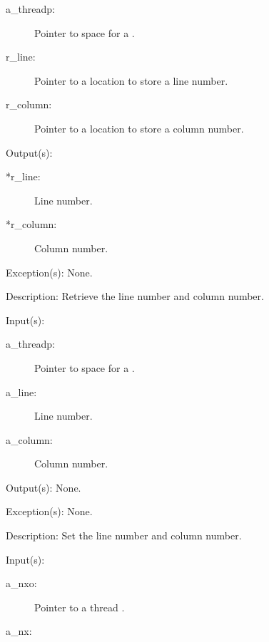 \begin{capi}
\begin{capilist}
\begin{description}
		\item[a\_threadp: ]
			Pointer to space for a .
		\item[r\_line: ]
			Pointer to a location to store a line number.
		\item[r\_column: ]
			Pointer to a location to store a column number.
		\end{description}
	\item[Output(s): ]
		\begin{description}\item[]
		\item[*r\_line: ]
			Line number.
		\item[*r\_column: ]
			Column number.
		\end{description}
	\item[Exception(s): ] None.
	\item[Description: ]
		Retrieve the line number and column number.
	\end{capilist}
\label{nxo_threadp_position_set}
	\begin{capilist}
	\item[Input(s): ]
		\begin{description}\item[]
		\item[a\_threadp: ]
			Pointer to space for a .
		\item[a\_line: ]
			Line number.
		\item[a\_column: ]
			Column number.
		\end{description}
	\item[Output(s): ] None.
	\item[Exception(s): ] None.
	\item[Description: ]
		Set the line number and column number.
	\end{capilist}
\label{nxo_thread_new}
	\begin{capilist}
	\item[Input(s): ]
		\begin{description}\item[]
		\item[a\_nxo: ]
			Pointer to a thread \classname{nxo}.
		\item[a\_nx: ]

\end{description}
\end{capilist}
\end{capi}
